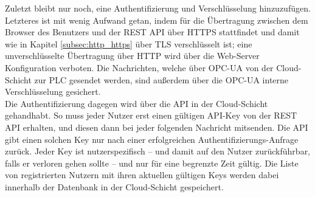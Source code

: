 Zuletzt bleibt nur noch, eine Authentifizierung und Verschlüsselung hinzuzufügen. Letzteres ist mit wenig Aufwand getan, indem für die Übertragung zwischen dem Browser des Benutzers und der REST API über HTTPS stattfindet und damit wie in Kapitel \ref{subsec:http_https} über TLS verschlüsselt ist; eine unverschlüsselte Übertragung über HTTP wird über die Web-Server Konfiguration verboten. Die Nachrichten, welche über OPC-UA von der Cloud-Schicht zur PLC gesendet werden, sind außerdem über die OPC-UA interne Verschlüsselung gesichert.\\
Die Authentifizierung dagegen wird über die API in der Cloud-Schicht gehandhabt. So muss jeder Nutzer erst einen gültigen API-Key von der REST API erhalten, und diesen dann bei jeder folgenden Nachricht mitsenden. Die API gibt einen solchen Key nur nach einer erfolgreichen Authentifizierungs-Anfrage zurück. Jeder Key ist nutzerspezifisch – und damit auf den Nutzer zurückführbar, falls er verloren gehen sollte – und nur für eine begrenzte Zeit gültig. Die Liste von registrierten Nutzern mit ihren aktuellen gültigen Keys werden dabei innerhalb der Datenbank in der Cloud-Schicht gespeichert.
